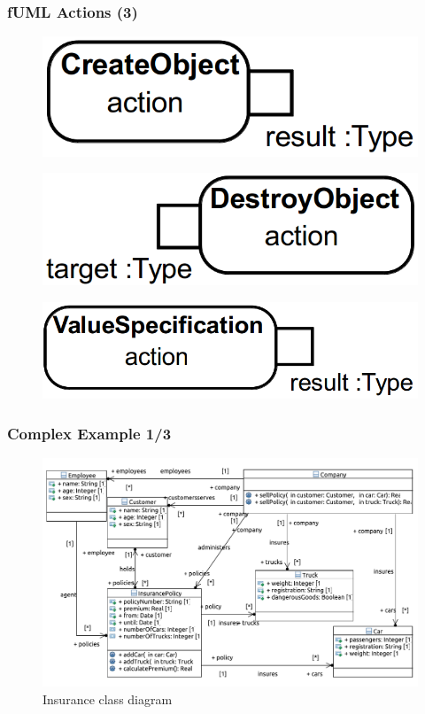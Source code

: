 \documentclass{beamer}
\begin{document}
\begin{frame}
 \frametitle{fUML Actions (3)}
\begin{figure}[h!t]
 \centering
 \includegraphics[scale=0.18]{images/fuml-actions/CreateObject.png}
\end{figure}
\begin{figure}[h!t]
 \centering
 \includegraphics[scale=0.18]{images/fuml-actions/DestroyObject.png}
\end{figure}
\begin{figure}[h!t]
 \centering
 \includegraphics[scale=0.18]{images/fuml-actions/ValueSpecification.png}
\end{figure}
\end{frame}


\begin{frame}
\frametitle{Complex Example 1/3}
\begin{figure}[h!t]
 \centering
 \includegraphics[scale=0.4]{images/insurance/Model_Model_ClassDiagram}
 \caption{Insurance class diagram}
 \label{fig:classdiagramcomplexRef}
\end{figure}
\end{frame}
\end{document}
